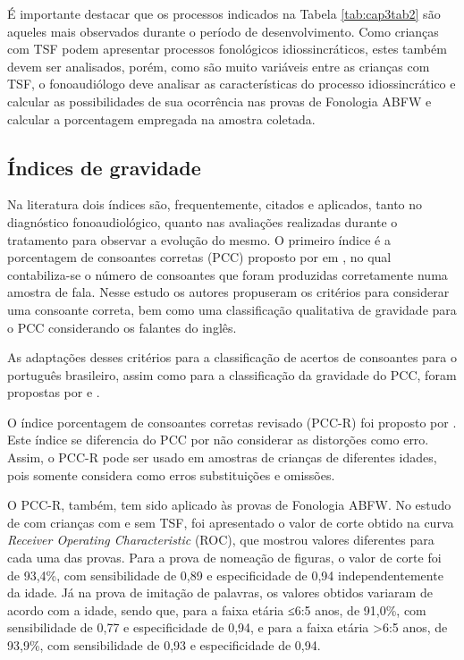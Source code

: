 \documentclass[output=paper,colorlinks,citecolor=brown,booklanguage=portuguese]{langscibook}
\begin{document}
É importante destacar que os processos indicados na Tabela \ref{tab:cap3tab2} são aqueles mais observados durante o período de desenvolvimento. Como crianças com TSF podem apresentar processos fonológicos idiossincráticos, estes também devem ser analisados, porém, como são muito variáveis entre as crianças com TSF, o fonoaudiólogo deve analisar as características do processo idiossincrático e calcular as possibilidades de sua ocorrência nas provas de Fonologia ABFW e calcular a porcentagem empregada na amostra coletada. 


\subsection{Índices de gravidade}
Na literatura dois índices são, frequentemente, citados e aplicados, tanto no diagnóstico fonoaudiológico, quanto nas avaliações realizadas durante o tratamento para observar a evolução do mesmo. O primeiro índice é a porcentagem de consoantes corretas (PCC) proposto por \citeauthor{Shriberg1982} em \citeyear{Shriberg1982}, no qual contabiliza-se o número de consoantes que foram produzidas corretamente numa amostra de fala. Nesse estudo os autores propuseram os critérios para considerar uma consoante correta, bem como uma classificação qualitativa de gravidade para o PCC considerando os falantes do inglês.

As adaptações desses critérios para a classificação de acertos de consoantes para o português brasileiro, assim como para a classificação da gravidade do PCC, foram propostas por \citet{Wertzner2002} e \citet{Wertzner2005}. 

O índice porcentagem de consoantes corretas revisado (PCC-R) foi proposto por \citet{Shriberg1997}. Este índice se diferencia do PCC por não considerar as distorções como erro. Assim, o PCC-R pode ser usado em amostras de crianças de diferentes idades, pois somente considera como erros substituições e omissões.

O PCC-R, também, tem sido aplicado às provas de Fonologia ABFW. No estudo de \citet{Barrozo2017} com crianças com e sem TSF, foi apresentado o valor de corte obtido na curva \emph{Receiver Operating Characteristic} (ROC), que mostrou valores diferentes para cada uma das provas. Para a prova de nomeação de figuras, o valor de corte foi de 93,4\%, com sensibilidade de 0,89 e especificidade de 0,94 independentemente da idade.  Já na prova de imitação de palavras, os valores obtidos variaram de acordo com a idade, sendo que, para a faixa etária ≤6:5 anos, de 91,0\%, com sensibilidade de 0,77 e especificidade de 0,94, e para a faixa etária >6:5 anos, de 93,9\%, com sensibilidade de 0,93 e especificidade de 0,94.
\end{document}
